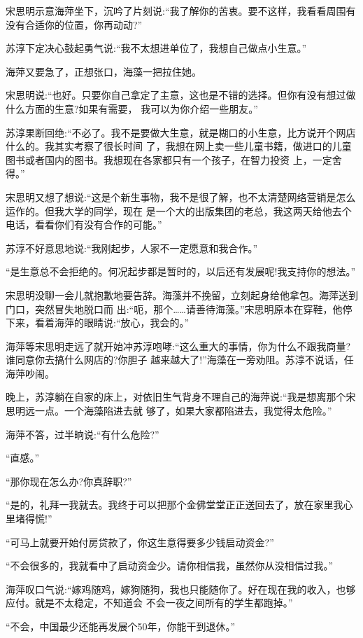 \documentclass[11pt,a4paper,onecolumn]{article}
\begin{document}
宋思明示意海萍坐下，沉吟了片刻说:``我了解你的苦衷。要不这样，我看看周围有没有合适你的位置，你再动动?''

苏淳下定决心鼓起勇气说:``我不太想进单位了，我想自己做点小生意。''

海萍又要急了，正想张口，海藻一把拉住她。

宋思明说:``也好。只要你自己拿定了主意，这也是不错的选择。但你有没有想过做什么方面的生意?如果有需要，
我可以为你介绍一些朋友。''

苏淳果断回绝:``不必了。我不是要做大生意，就是糊口的小生意，比方说开个网店什么的。我其实考察了很长时间
了，我想在网上卖一些儿童书籍，做进口的儿童图书或者国内的图书。我想现在各家都只有一个孩子，在智力投资
上，一定舍得。''

宋思明又想了想说:``这是个新生事物，我不是很了解，也不太清楚网络营销是怎么运作的。但我大学的同学，现在
是一个大的出版集团的老总，我这两天给他去个电话，看看你们有没有合作的可能。''

苏淳不好意思地说:``我刚起步，人家不一定愿意和我合作。''

``是生意总不会拒绝的。何况起步都是暂时的，以后还有发展呢!我支持你的想法。''

宋思明没聊一会儿就抱歉地要告辞。海藻并不挽留，立刻起身给他拿包。海萍送到门口，突然冒失地脱口而
出:``呃，那个……请善待海藻。''宋思明原本在穿鞋，他停下来，看着海萍的眼睛说:``放心，我会的。''

海萍等宋思明走远了就开始冲苏淳咆哮:``这么重大的事情，你为什么不跟我商量?谁同意你去搞什么网店的?你胆子
越来越大了!''海藻在一旁劝阻。苏淳不说话，任海萍吵闹。

晚上，苏淳躺在自家的床上，对依旧生气背身不理自己的海萍说:``我是想离那个宋思明远一点。一个海藻陷进去就
够了，如果大家都陷进去，我觉得太危险。''

海萍不答，过半晌说:``有什么危险?''

``直感。''

``那你现在怎么办?你真辞职?''

``是的，礼拜一我就去。我终于可以把那个金佛堂堂正正送回去了，放在家里我心里堵得慌!''

``可马上就要开始付房贷款了，你这生意得要多少钱启动资金?''

``不会很多的，我就看中了启动资金少。请你相信我，虽然你从没相信过我。''

海萍叹口气说:``嫁鸡随鸡，嫁狗随狗，我也只能随你了。好在现在我的收入，也够应付。就是不太稳定，不知道会
不会一夜之间所有的学生都跑掉。''

``不会，中国最少还能再发展个50年，你能干到退休。''
\end{document}
